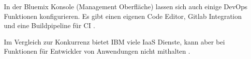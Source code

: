 In der Bluemix Konsole (Management Oberfläche) lassen sich auch einige \gls{DevOps} Funktionen konfigurieren. Es gibt einen eigenen Code Editor, Gitlab Integration und eine Buildpipeline für \ac{CI} \parencite{fassnacht.2016}.

Im Vergleich zur Konkurrenz bietet IBM viele \acs{IaaS} Dienste, kann aber bei Funktionen für Entwickler von Anwendungen nicht mithalten \parencite{computerwoche.2016}. 


